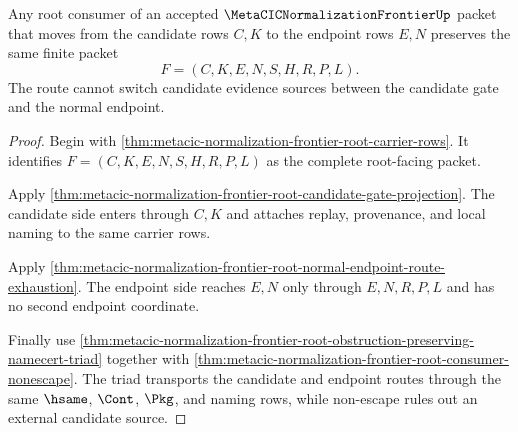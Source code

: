 \begin{theorem}
\label{thm:metacic-normalization-frontier-root-candidate-endpoint-coherence}
Any root consumer of an accepted $\MetaCICNormalizationFrontierUp$ packet that moves from the candidate rows $C,K$ to the endpoint rows $E,N$ preserves the same finite packet
$$
F=(C,K,E,N,S,H,R,P,L).
$$
The route cannot switch candidate evidence sources between the candidate gate and the normal endpoint.
\end{theorem}
\begin{proof}
Begin with \autoref{thm:metacic-normalization-frontier-root-carrier-rows}. It identifies $F=(C,K,E,N,S,H,R,P,L)$ as the complete root-facing packet.

Apply \autoref{thm:metacic-normalization-frontier-root-candidate-gate-projection}. The candidate side enters through $C,K$ and attaches replay, provenance, and local naming to the same carrier rows.

Apply \autoref{thm:metacic-normalization-frontier-root-normal-endpoint-route-exhaustion}. The endpoint side reaches $E,N$ only through $E,N,R,P,L$ and has no second endpoint coordinate.

Finally use \autoref{thm:metacic-normalization-frontier-root-obstruction-preserving-namecert-triad} together with \autoref{thm:metacic-normalization-frontier-root-consumer-nonescape}. The triad transports the candidate and endpoint routes through the same $\hsame$, $\Cont$, $\Pkg$, and naming rows, while non-escape rules out an external candidate source.
\end{proof}


